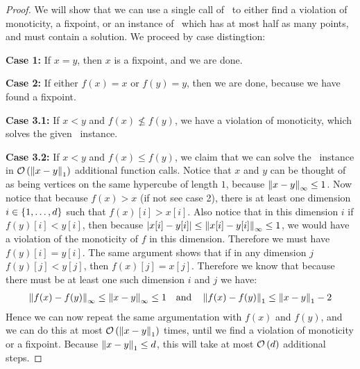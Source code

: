 \begin{proof}
    We will show that we can use a single call of \Tarskistar\ to either find a violation of monoticity, a fixpoint, or an instance of \Tarski\ which has at most half as many points, and must contain a solution. We proceed by case distingtion:

    \textbf{Case 1:} If $x=y$, then $x$ is a fixpoint, and we are done.

    \textbf{Case 2:} If either $f(x) = x$ or $f(y) = y$, then we are done, because we have found a fixpoint.

    \textbf{Case 3.1:} If $x < y$ and $f(x) \not\leq f(y)$, we have a violation of monoticity, which solves the given \Tarski\ instance.

    \textbf{Case 3.2:} If $x < y$ and $f(x) \leq f(y)$, we claim that we can solve the \Tarski\ instance in $\mathcal{O}\left(\left\lVert x - y\right\rVert_{1}\right)$ additional function calls. Notice that $x$ and $y$ can be thought of as being vertices on the same hypercube of length $1$, because $\left\lVert x-y\right\rVert_{\infty} \leq 1$. Now notice that because $f(x) > x$ (if not see case 2), there is at least one dimension $i \in \left\{1, \dots, d\right\}$ such that $f(x)[i] > x[i]$. Also notice that in this dimension $i$ if $f(y)[i] < y[i]$, then because $\left\lvert x[i] - y[i]\right\rvert \leq \left\lVert x[i] - y[i]\right\rVert_{\infty} \leq 1$, we would have a violation of the monoticity of $f$ in this dimension. Therefore we must have $f(y)[i] = y[i]$. The same argument shows that if in any dimension $j$ $f(y)[j] < y[j]$, then $f(x)[j] = x[j]$. Therefore we know that because there must be at least one such dimension $i$ and $j$ we have:
    \begin{align*}
        \left\lVert f(x) - f(y)\right\rVert_{\infty} \leq \left\lVert x - y\right\rVert_{\infty} \leq 1 \quad \text{and} \quad \left\lVert f(x) - f(y)\right\rVert_{1} \leq \left\lVert x - y\right\rVert_{1} - 2
    \end{align*}
    Hence we can now repeat the same argumentation with $f(x)$ and $f(y)$, and we can do this at most $\mathcal{O}\left(\left\lVert x - y\right\rVert_{1}\right)$ times, until we find a violation of monoticity or a fixpoint. Because $\left\lVert x - y\right\rVert_{1} \leq d$, this will take at most $\mathcal{O}\left(d\right)$ additional steps.


\end{proof}
